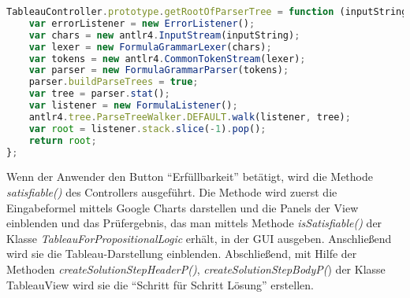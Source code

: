 \begin{lstlisting}[language=JavaScript, caption=getRootOfParserTree() (Klasse TableauController), basicstyle=\scriptsize] 
TableauController.prototype.getRootOfParserTree = function (inputString) {
    var errorListener = new ErrorListener();
    var chars = new antlr4.InputStream(inputString);
    var lexer = new FormulaGrammarLexer(chars);
    var tokens = new antlr4.CommonTokenStream(lexer);
    var parser = new FormulaGrammarParser(tokens);
    parser.buildParseTrees = true;
    var tree = parser.stat();
    var listener = new FormulaListener();
    antlr4.tree.ParseTreeWalker.DEFAULT.walk(listener, tree);
    var root = listener.stack.slice(-1).pop();
    return root;
};
\end{lstlisting}

Wenn der Anwender den Button ``Erfüllbarkeit'' betätigt, wird die Methode \textit{satisfiable()} des Controllers ausgeführt. Die Methode wird zuerst die Eingabeformel mittels Google Charts darstellen und die Panels der View einblenden und das Prüfergebnis, das man mittels Methode \textit{isSatisfiable()} der Klasse \textit{TableauForPropositionalLogic} erhält, in der GUI ausgeben. Anschließend wird sie die  Tableau-Darstellung einblenden. Abschließend, mit Hilfe der Methoden \textit{createSolutionStepHeaderP()}, \textit{createSolutionStepBodyP(}) der Klasse TableauView wird sie die ``Schritt für Schritt Lösung'' erstellen.

